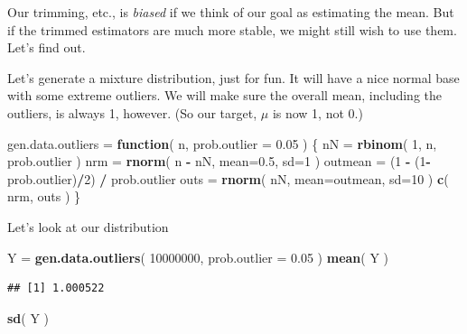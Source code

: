 \documentclass[
]{book}
\newenvironment{Shaded}{\begin{snugshade}}{\end{snugshade}}
\newcommand{\AttributeTok}[1]{\textcolor[rgb]{0.13,0.29,0.53}{#1}}
\newcommand{\ControlFlowTok}[1]{\textcolor[rgb]{0.13,0.29,0.53}{\textbf{#1}}}
\newcommand{\DecValTok}[1]{\textcolor[rgb]{0.00,0.00,0.81}{#1}}
\newcommand{\FloatTok}[1]{\textcolor[rgb]{0.00,0.00,0.81}{#1}}
\newcommand{\FunctionTok}[1]{\textcolor[rgb]{0.13,0.29,0.53}{\textbf{#1}}}
\newcommand{\NormalTok}[1]{#1}
\newcommand{\OtherTok}[1]{\textcolor[rgb]{0.56,0.35,0.01}{#1}}
\newcommand{\SpecialCharTok}[1]{\textcolor[rgb]{0.81,0.36,0.00}{\textbf{#1}}}
\begin{document}
Our trimming, etc., is \emph{biased} if we think of our goal as estimating the
mean. But if the trimmed estimators are much more stable, we might still
wish to use them. Let's find out.

Let's generate a mixture distribution, just for fun. It will have a nice
normal base with some extreme outliers. We will make sure the overall mean,
including the outliers, is always 1, however. (So our target, \(\mu\) is now 1,
not 0.)

\begin{Shaded}
\begin{Highlighting}[]
\NormalTok{gen.data.outliers }\OtherTok{=} \ControlFlowTok{function}\NormalTok{( n, }\AttributeTok{prob.outlier =} \FloatTok{0.05}\NormalTok{ ) \{}
\NormalTok{    nN }\OtherTok{=} \FunctionTok{rbinom}\NormalTok{( }\DecValTok{1}\NormalTok{, n, prob.outlier )}
\NormalTok{    nrm }\OtherTok{=} \FunctionTok{rnorm}\NormalTok{( n }\SpecialCharTok{{-}}\NormalTok{ nN, }\AttributeTok{mean=}\FloatTok{0.5}\NormalTok{, }\AttributeTok{sd=}\DecValTok{1}\NormalTok{ )}
\NormalTok{    outmean }\OtherTok{=}\NormalTok{ (}\DecValTok{1} \SpecialCharTok{{-}}\NormalTok{ (}\DecValTok{1}\SpecialCharTok{{-}}\NormalTok{prob.outlier)}\SpecialCharTok{/}\DecValTok{2}\NormalTok{) }\SpecialCharTok{/}\NormalTok{ prob.outlier}
\NormalTok{    outs }\OtherTok{=} \FunctionTok{rnorm}\NormalTok{( nN, }\AttributeTok{mean=}\NormalTok{outmean, }\AttributeTok{sd=}\DecValTok{10}\NormalTok{ )}
    \FunctionTok{c}\NormalTok{( nrm, outs )}
\NormalTok{\}}
\end{Highlighting}
\end{Shaded}

Let's look at our distribution

\begin{Shaded}
\begin{Highlighting}[]
\NormalTok{Y }\OtherTok{=} \FunctionTok{gen.data.outliers}\NormalTok{( }\DecValTok{10000000}\NormalTok{, }\AttributeTok{prob.outlier =} \FloatTok{0.05}\NormalTok{ )}
\FunctionTok{mean}\NormalTok{( Y )}
\end{Highlighting}
\end{Shaded}

\begin{verbatim}
## [1] 1.000522
\end{verbatim}

\begin{Shaded}
\begin{Highlighting}[]
\FunctionTok{sd}\NormalTok{( Y )}
\end{Highlighting}
\end{Shaded}
\end{document}
